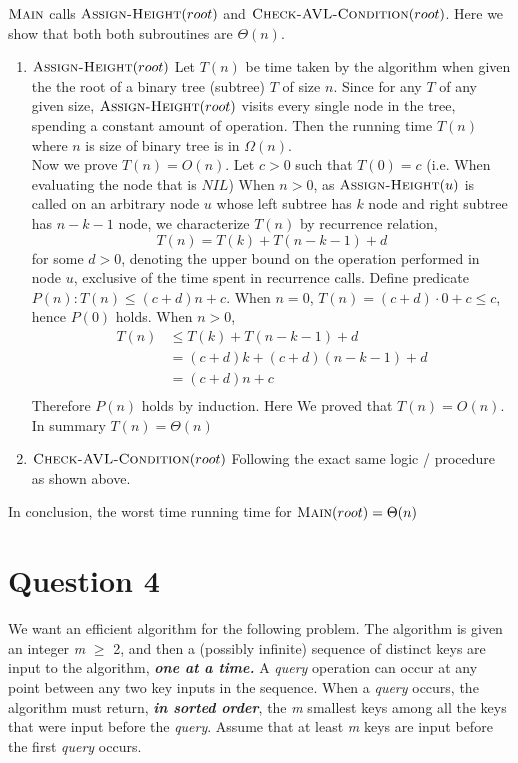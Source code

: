 \documentclass[11pt]{article}
\begin{document}
\begin{solution}
  $\textsc{Main}$ calls $\textsc{Assign-Height}(root)$ and $\textsc{Check-AVL-Condition}(root)$. Here we show that both both subroutines are $\Theta(n)$.
  \begin{enumerate}
    \item $\textsc{Assign-Height}(root)$ Let $T(n)$ be time taken by the algorithm when given the the root of a binary tree (subtree) $T$ of size $n$. Since for any $T$ of any given size, $\textsc{Assign-Height}(root)$ visits every single node in the tree, spending a constant amount of operation. Then the running time $T(n)$ where $n$ is size of binary tree is in $\Omega(n)$. \\
    Now we prove $T(n) = O(n)$. Let $c>0$ such that $T(0) = c$ (i.e. When evaluating the node that is $NIL$) When $n>0$, as $\textsc{Assign-Height}(u)$ is called on an arbitrary node $u$ whose left subtree has $k$ node and right subtree has $n-k-1$ node, we characterize $T(n)$ by recurrence relation,
    \[
      T(n) = T(k) + T(n-k-1) + d
    \]
    for some $d>0$, denoting the upper bound on the operation performed in node $u$, exclusive of the time spent in recurrence calls. Define predicate $P(n): T(n) \leq (c+d)n + c$. When $n=0$, $T(n) = (c+d)\cdot 0 + c \leq c$, hence $P(0)$ holds. When $n>0$,
    \begin{align*}
        T(n) &\leq T(k) + T(n-k-1) + d \\
        &= (c+d)k + (c+d)(n-k-1) + d \tag{inductive hypothesis}\\
        &= (c+d)n + c\\
    \end{align*}
    Therefore $P(n)$ holds by induction. Here We proved that $T(n) = O(n)$. \\
    In summary $T(n) = \Theta(n)$
    \item $\textsc{Check-AVL-Condition}(root)$ Following the exact same logic / procedure as shown above.
  \end{enumerate}
  In conclusion, the worst time running time for $\textsc{Main}(root) = \Theta(n)$
\end{solution}


\section *{Question 4}
We want an efficient algorithm for the following problem. The algorithm is given an integer \textit{m} $\geq$ 2, and then a (possibly infinite) sequence of distinct keys are input to the algorithm, \textit{\textbf{one at a time.}} A \textit{query} operation can occur at any point between any two key inputs in the sequence. When a \textit{query} occurs, the algorithm must return, \textit{\textbf{in sorted order}}, the \textit{m} smallest keys among all the keys that were input before the \textit{query}. Assume that at least \textit{m} keys are input before the first \textit{query} occurs.
\end{document}
